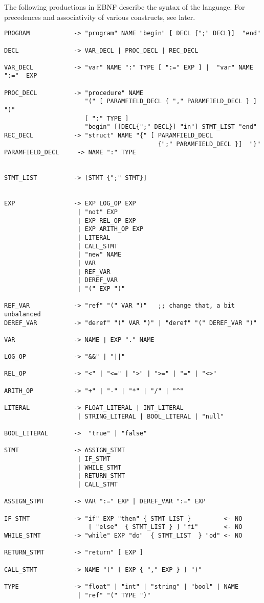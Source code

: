 \documentclass[11pt]{article}
\begin{document}
The following productions in EBNF describe the syntax of the language.  For
precedences and associativity of various constructs, see later.



\lstset{language=compila,label= ,caption= ,captionpos=b,numbers=none}
\begin{lstlisting}
PROGRAM            -> "program" NAME "begin" [ DECL {";" DECL}]  "end"

DECL               -> VAR_DECL | PROC_DECL | REC_DECL

VAR_DECL           -> "var" NAME ":" TYPE [ ":=" EXP ] |  "var" NAME ":="  EXP 

PROC_DECL          -> "procedure" NAME 
                      "(" [ PARAMFIELD_DECL { "," PARAMFIELD_DECL } ] ")"
                      [ ":" TYPE ]
                      "begin" [[DECL{";" DECL}] "in"] STMT_LIST "end"
REC_DECL           -> "struct" NAME "{" [ PARAMFIELD_DECL 
                                          {";" PARAMFIELD_DECL }]  "}"
PARAMFIELD_DECL     -> NAME ":" TYPE


STMT_LIST          -> [STMT {";" STMT}]    


EXP                -> EXP LOG_OP EXP
                    | "not" EXP
                    | EXP REL_OP EXP
                    | EXP ARITH_OP EXP
                    | LITERAL
                    | CALL_STMT
                    | "new" NAME
                    | VAR
                    | REF_VAR
                    | DEREF_VAR
                    | "(" EXP ")"

REF_VAR            -> "ref" "(" VAR ")"   ;; change that, a bit unbalanced
DEREF_VAR          -> "deref" "(" VAR ")" | "deref" "(" DEREF_VAR ")"

VAR                -> NAME | EXP "." NAME

LOG_OP             -> "&&" | "||" 

REL_OP             -> "<" | "<=" | ">" | ">=" | "=" | "<>"

ARITH_OP           -> "+" | "-" | "*" | "/" | "^"

LITERAL            -> FLOAT_LITERAL | INT_LITERAL 
                    | STRING_LITERAL | BOOL_LITERAL | "null"

BOOL_LITERAL       ->  "true" | "false" 

STMT               -> ASSIGN_STMT
                    | IF_STMT
                    | WHILE_STMT
                    | RETURN_STMT
                    | CALL_STMT

ASSIGN_STMT        -> VAR ":=" EXP | DEREF_VAR ":=" EXP

IF_STMT            -> "if" EXP "then" { STMT_LIST }         <- NO
                       [ "else"  { STMT_LIST } ] "fi"       <- NO
WHILE_STMT         -> "while" EXP "do"  { STMT_LIST  } "od" <- NO

RETURN_STMT        -> "return" [ EXP ]

CALL_STMT          -> NAME "(" [ EXP { "," EXP } ] ")"

TYPE               -> "float" | "int" | "string" | "bool" | NAME
                    | "ref" "(" TYPE ")"
\end{lstlisting}
\end{document}
